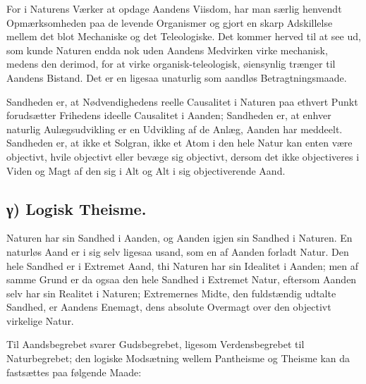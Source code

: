 \documentclass[12pt]{book}
\newcommand{\opage}[1]{\marginnote{\footnotesize\textit{[#1]}}}
\begin{document}
For i Naturens Værker at opdage Aandens Viisdom, har man særlig
henvendt Opmærksomheden paa de levende Organismer og gjort en skarp
Adskillelse mellem det blot
\opage{85} Mechaniske og det Teleologiske. Det kommer herved til at see ud, som
kunde Naturen endda nok uden Aandens Medvirken virke mechanisk,
medens den derimod, for at virke organisk-teleologisk, øiensynlig
trænger til Aandens Bistand. Det er en ligesaa unaturlig som aandløs
Betragtningsmaade.

Sandheden er, at Nødvendighedens reelle Causalitet i Naturen paa
ethvert Punkt forudsætter Frihedens ideelle Causalitet i Aanden;
Sandheden er, at enhver naturlig Aulægsudvikling er en Udvikling af
de Anlæg, Aanden har meddeelt. Sandheden er, at ikke et Solgran,
ikke et Atom i den hele Natur kan enten være objectivt, hvile
objectivt eller bevæge sig objectivt, dersom det ikke objectiveres i
Viden og Magt af den sig i Alt og Alt i sig objectiverende Aand.

\subsection*{γ) Logisk Theisme.}
Naturen har sin Sandhed i Aanden, og Aanden igjen sin Sandhed i
Naturen. En naturløs Aand er i sig selv ligesaa usand, som en af
Aanden forladt Natur. Den hele Sandhed er i Extremet Aand, thi
Naturen har sin Idealitet i Aanden; men af samme Grund er da ogsaa
den hele Sandhed i Extremet Natur, eftersom Aanden selv har sin
Realitet i Naturen; Extremernes Midte, den fuldstændig udtalte
Sandhed, er Aandens Enemagt, dens absolute Overmagt over den
objectivt virkelige Natur.

Til Aandsbegrebet svarer Gudsbegrebet, ligesom Verdensbegrebet til
Naturbegrebet; den logiske Modsætning wellem Pantheisme og Theisme
kan da fastsættes paa følgende Maade:
\end{document}
